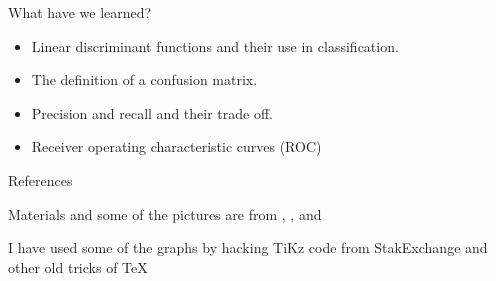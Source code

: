 \documentclass{beamer}
\begin{document}
\begin{frame}{What have we learned?}
	\begin{itemize}
		\item Linear discriminant functions and their use in classification.
		\item The definition of a confusion matrix.
		\item Precision and recall and their trade off. 
		\item Receiver operating characteristic curves (ROC)

		
	\end{itemize}
\end{frame}


\begin{frame}{References}
	

Materials and some of the pictures are from \citep{James2015}, \citep{duda}, and \citep{geron2}
\printbibliography 

	
	I have used some of the graphs by hacking TiKz code from StakExchange and other old tricks of \TeX
\end{frame}		
\end{document}
